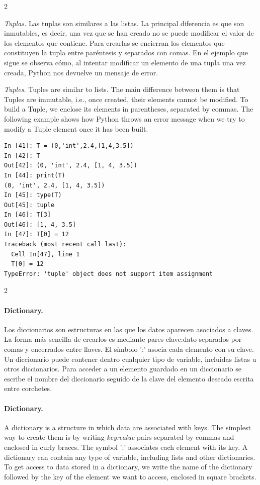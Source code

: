 \begin{paracol}{2}

\emph{Tuplas.} Las tuplas son similares a las listas. La principal diferencia es que son inmutables, es decir, una vez que se han creado no se puede modificar el valor de los elementos que contiene. Para crearlas se encierran los elementos que constituyen la tupla entre paréntesis y separados con comas. En el ejemplo que sigue se observa cómo, al intentar modificar un elemento de una tupla una vez creada, Python nos devuelve un mensaje de error.
\switchcolumn

\emph{Tuples.} Tuples are similar to lists. The main difference between them is that Tuples are immutable, i.e., once created, their elements cannot be modified. To build a Tuple, we enclose its elements in parentheses, separated by commas. The following example shows how Python throws an error message when we try to modify a Tuple element once it has been built.
\end{paracol}
\begin{center}
\begin{minipage}{0.4\textwidth}
\begin{verbatim}
In [41]: T = (0,'int',2.4,[1,4,3.5])
In [42]: T
Out[42]: (0, 'int', 2.4, [1, 4, 3.5])
In [44]: print(T)
(0, 'int', 2.4, [1, 4, 3.5])
In [45]: type(T)
Out[45]: tuple
In [46]: T[3]
Out[46]: [1, 4, 3.5]
In [47]: T[0] = 12
Traceback (most recent call last):
  Cell In[47], line 1
  T[0] = 12
TypeError: 'tuple' object does not support item assignment
\end{verbatim}
\end{minipage}
\end{center}

\begin{paracol}{2}
\paragraph{Dictionary.} Los diccionarios son estructuras en las que los datos aparecen asociados a claves. La forma más sencilla de crearlos es mediante pares clave:dato separados por comas y encerrados entre llaves. El símbolo ':' asocia cada elemento con su clave. Un diccionario puede contener dentro cualquier tipo de variable, incluidas listas u otros diccionarios. Para acceder a un elemento guardado en un diccionario se escribe el nombre del diccionario seguido de la clave del elemento deseado escrita entre corchetes.

\switchcolumn
\paragraph{Dictionary.} A dictionary is a structure in which data are associated with keys. The simplest way to create them is by writing \emph{key:value} pairs separated by commas and enclosed in curly braces. The symbol ':' associates each element with its key. A dictionary can contain any type of variable, including lists and other dictionaries. To get access to data stored in a dictionary, we write the name of the dictionary followed by the key of the element we want to access, enclosed in square brackets.
\end{paracol}


